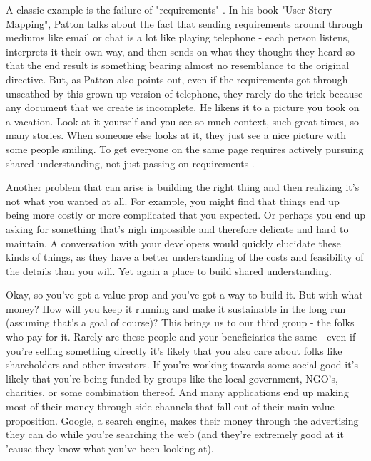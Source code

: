 \documentclass[11pt,a5paper]{book}
\begin{document}
A classic example is the failure of "requirements" \cite{patton}. In his book "User Story Mapping", Patton talks about the fact that sending requirements around through mediums like email or chat is a lot like playing telephone - each person listens, interprets it their own way, and then sends on what they thought they heard so that the end result is something bearing almost no resemblance to the original directive. But, as Patton also points out, even if the requirements got through unscathed by this grown up version of telephone, they rarely do the trick because any document that we create is incomplete. He likens it to a picture you took on a vacation. Look at it yourself and you see so much context, such great times, so many stories. When someone else looks at it, they just see a nice picture with some people smiling. To get everyone on the same page requires actively pursuing shared understanding, not just passing on requirements \cite{patton}.
\newline

Another problem that can arise is building the right thing and then realizing it's not what you wanted at all. For example, you might find that things end up being more costly or more complicated that you expected. Or perhaps you end up asking for something that's nigh impossible and therefore delicate and hard to maintain. A conversation with your developers would quickly elucidate these kinds of things, as they have a better understanding of the costs and feasibility of the details than you will. Yet again a place to build shared understanding.
\newline

Okay, so you've got a value prop and you've got a way to build it. But with what money? How will you keep it running and make it sustainable in the long run (assuming that's a goal of course)? This brings us to our third group - the folks who pay for it. Rarely are these people and your beneficiaries the same - even if you're selling something directly it's likely that you also care about folks like shareholders and other investors. If you're working towards some social good it's likely that you're being funded by groups like the local government, NGO's, charities, or some combination thereof. And many applications end up making most of their money through side channels that fall out of their main value proposition. Google, a search engine, makes their money through the advertising they can do while you're searching the web (and they're extremely good at it 'cause they know what you've been looking at). 
\newline
\end{document}
